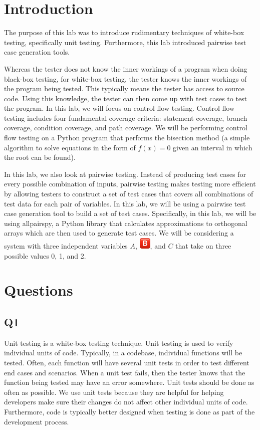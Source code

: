 \documentclass[12pt, letterpaper, titlepage]{article}
\title{\textbf{\Huge{
    \begin{center}
        ECE 322 Lab Report \#3
    \end{center}
}}}
\author{
\B enjamin Kong \\
1573684 \\
}
\newcommand{\B}{\includegraphics[height=1.5em, valign=B, raise=-0.2em]{BigB.png}}
\begin{document}
 
\onehalfspacing

\maketitle
\newpage

\section*{Introduction}
The purpose of this lab was to introduce rudimentary techniques of white-box testing, specifically unit testing. Furthermore, this lab introduced pairwise test case generation tools.

Whereas the tester does not know the inner workings of a program when doing black-box testing, for white-box testing, the tester knows the inner workings of the program being tested. This typically means the tester has access to source code. Using this knowledge, the tester can then come up with test cases to test the program. In this lab, we will focus on control flow testing. Control flow testing includes four fundamental coverage criteria: statement coverage, branch coverage, condition coverage, and path coverage. We will be performing control flow testing on a Python program that performs the bisection method (a simple algorithm to solve equations in the form of $f(x)=0$ given an interval in which the root can be found).

In this lab, we also look at pairwise testing. Instead of producing test cases for every possible combination of inputs, pairwise testing makes testing more efficient by allowing testers to construct a set of test cases that covers all combinations of test data for each pair of variables. In this lab, we will be using a pairwise test case generation tool to build a set of test cases. Specifically, in this lab, we will be using allpairspy, a Python library that calculates approximations to orthogonal arrays which are then used to generate test cases. We will be considering a system with three independent variables $A$, \B, and $C$ that take on three possible values 0, 1, and 2.

\section*{Questions}
\subsection*{Q1}
Unit testing is a white-box testing technique. Unit testing is used to verify individual units of code. Typically, in a codebase, individual functions will be tested. Often, each function will have several unit tests in order to test different end cases and scenarios. When a unit test fails, then the tester knows that the function being tested may have an error somewhere. Unit tests should be done as often as possible. We use unit tests because they are helpful for helping developers make sure their changes do not affect other individual units of code. Furthermore, code is typically better designed when testing is done as part of the development process.
\end{document}
